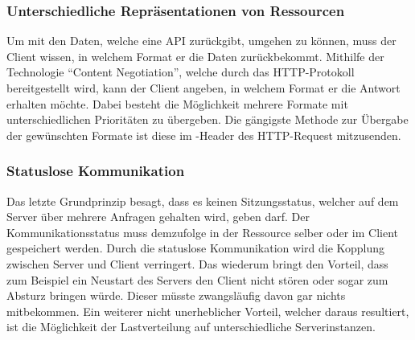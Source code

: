 \subsubsection{Unterschiedliche Repräsentationen von Ressourcen}
Um mit den Daten, welche eine \gls{API} zurückgibt, umgehen zu können, muss der Client wissen, in welchem Format er die Daten zurückbekommt. Mithilfe der Technologie \enquote{Content Negotiation}, welche durch das \gls{HTTP}-Protokoll bereitgestellt wird, kann der Client angeben, in welchem Format er die Antwort erhalten möchte. Dabei besteht die Möglichkeit mehrere Formate mit unterschiedlichen Prioritäten zu übergeben. Die gängigste Methode zur Übergabe der gewünschten Formate ist diese im -Header des \gls{HTTP}-Request mitzusenden.

\subsubsection{Statuslose Kommunikation}\label{sec:statelessCommunikation}
Das letzte Grundprinzip besagt, dass es keinen Sitzungsstatus, welcher auf dem Server über mehrere Anfragen gehalten wird, geben darf. Der Kommunikationsstatus muss demzufolge in der Ressource selber oder im Client gespeichert werden. Durch die statuslose Kommunikation wird die Kopplung zwischen Server und Client verringert. Das wiederum bringt den Vorteil, dass zum Beispiel ein Neustart des Servers den Client nicht stören oder sogar zum Absturz bringen würde. Dieser müsste zwangsläufig davon gar nichts mitbekommen. Ein weiterer nicht unerheblicher Vorteil, welcher daraus resultiert, ist die Möglichkeit der Lastverteilung auf unterschiedliche Serverinstanzen.

